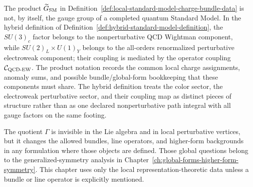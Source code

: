 The product \(\widetilde G_{\rm SM}\) in
Definition~\ref{def:local-standard-model-charge-bundle-data} is not, by itself, the
gauge group of a completed quantum Standard Model.  In the hybrid definition
of Definition~\ref{def:hybrid-standard-model-definition}, the \(SU(3)_c\) factor
belongs to the nonperturbative QCD Wightman component, while
\(SU(2)_L\times U(1)_Y\) belongs to the all-orders renormalized perturbative
electroweak component; their coupling is mediated by the operator coupling
\(\mathcal C_{\rm QCD\text{-}EW}\).  The product notation records the common
local charge assignments, anomaly sums, and possible bundle/global-form
bookkeeping that these components must share.  The hybrid definition treats the
color sector, the electroweak perturbative sector, and their coupling map as
distinct pieces of structure rather than as one declared nonperturbative path
integral with all gauge factors on the same footing.

The quotient \(\Gamma\) is invisible in the Lie algebra and in local
perturbative vertices, but it changes the allowed bundles, line operators,
and higher-form backgrounds in any formulation where those objects are
defined.  Those global questions belong to the generalized-symmetry analysis
in Chapter~\ref{ch:global-forms-higher-form-symmetry}.  This chapter uses
only the local representation-theoretic data unless a bundle or line operator
is explicitly mentioned.

